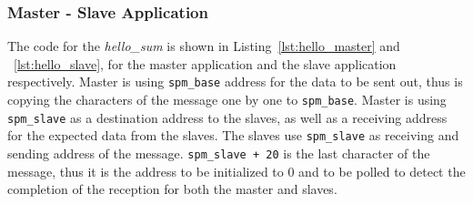 \documentclass[a4paper,fontsize=10pt,twoside,DIV15,BCOR12mm,headinclude=true,footinclude=false,pagesize,bibtotoc]{scrbook}
\newcommand{\code}[1]{{\texttt{#1}}}
\begin{document}
\subsubsection{Master - Slave Application}
The code for the \textit{hello\_sum} is shown in Listing~\ref{lst:hello_master} and ~\ref{lst:hello_slave}, 
for the master application and the slave application respectively.
Master is using \code{spm\_base} address for the data to be sent out, thus is copying the characters of the message one by one to \code{spm\_base}.
Master is using \code{spm\_slave} as a destination address to the slaves, as well as a receiving address for the expected data from the slaves. 
The slaves use \code{spm\_slave} as receiving and sending address of the message. \code{spm\_slave + 20} is the last character of the message, 
thus it is the address to be initialized to 0 and to be polled to detect the completion of the reception for both the master and slaves.

%
%
%






\end{document}
